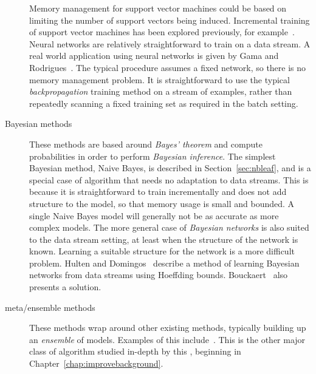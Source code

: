 \begin{description}
Memory management for support vector machines could be based on limiting the number of support vectors being induced. Incremental training of support vector machines has been explored previously, for example~\cite{incrsvm}.
Neural networks are relatively straightforward to train on a data stream. A real world application using neural networks is given by Gama and Rodrigues~\cite{gama_ann}. The typical procedure assumes a fixed network, so there is no memory management problem. It is straightforward to use the typical {\em backpropagation} training method on a stream of examples, rather than repeatedly scanning a fixed training set as required in the batch setting.
\item[Bayesian methods] These methods are based around {\em Bayes' theorem} and compute probabilities in order to perform {\em Bayesian inference}. The simplest Bayesian
method, Naive Bayes, is described in Section~\ref{sec:nbleaf}, and is a special case of algorithm that needs no adaptation to data streams. This is because it is straightforward to train incrementally and does not add structure to the model, so that memory usage is small and bounded. A single Naive Bayes model will generally not be as accurate as more complex models. The more general case of {\em Bayesian networks} is also suited to the data stream setting, at least when the structure of the network is known. Learning a suitable structure for the network is a more difficult problem. Hulten and Domingos~\cite{mineabitrarydb} describe a method of learning Bayesian networks from data streams using Hoeffding bounds. Bouckaert~\cite{remcobayesstream} also presents a solution.
\item[meta/ensemble methods] These methods wrap around other existing methods, typically building up an {\em ensemble} of models. Examples of this include~\cite{ozabagboost, anncad}. This is the other major class of algorithm studied in-depth by this \thesis, beginning in Chapter~\ref{chap:improvebackground}.
\end{description}

